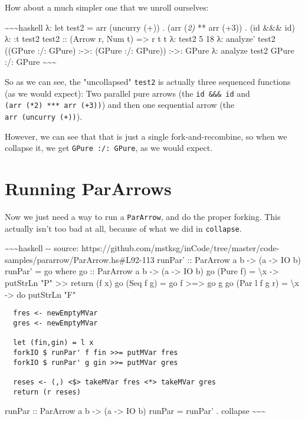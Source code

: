 \documentclass[]{article}
\begin{document}
How about a much simpler one that we unroll ourselves:

\textasciitilde{}\textasciitilde{}\textasciitilde{}haskell λ: let test2 = arr
(uncurry (+)) \textbar{} . (arr (\emph{2) }** arr (+3)) \textbar{} . (id \&\&\&
id) λ: :t test2 test2 :: (Arrow r, Num t) =\textgreater{} r t t λ: test2 5 18 λ:
analyze' test2 ((GPure :/: GPure) :-\textgreater{}: (GPure :/: GPure))
:-\textgreater{}: GPure λ: analyze test2 GPure :/: GPure
\textasciitilde{}\textasciitilde{}\textasciitilde{}

So as we can see, the "uncollapsed" \texttt{test2} is actually three sequenced
functions (as we would expect): Two parallel pure arrows (the
\texttt{id\ \&\&\&\ id} and \texttt{(arr\ (*2)\ ***\ arr\ (+3))}) and then one
sequential arrow (the \texttt{arr\ (uncurry\ (+))}).

However, we can see that that is just a single fork-and-recombine, so when we
collapse it, we get \texttt{GPure\ :/:\ GPure}, as we would expect.

\section{Running ParArrows}

Now we just need a way to run a \texttt{ParArrow}, and do the proper forking.
This actually isn't too bad at all, because of what we did in \texttt{collapse}.

\textasciitilde{}\textasciitilde{}\textasciitilde{}haskell -\/- source:
https://github.com/mstksg/inCode/tree/master/code-samples/pararrow/ParArrow.hs\#L92-113
runPar' :: ParArrow a b -\textgreater{} (a -\textgreater{} IO b) runPar' = go
where go :: ParArrow a b -\textgreater{} (a -\textgreater{} IO b) go (Pure f) =
\textbackslash{}x -\textgreater{} putStrLn "P" \textgreater{}\textgreater{}
return (f x) go (Seq f g) = go f \textgreater{}=\textgreater{} go g go (Par l f
g r) = \textbackslash{}x -\textgreater{} do putStrLn "F"

\begin{verbatim}
  fres <- newEmptyMVar
  gres <- newEmptyMVar

  let (fin,gin) = l x
  forkIO $ runPar' f fin >>= putMVar fres
  forkIO $ runPar' g gin >>= putMVar gres

  reses <- (,) <$> takeMVar fres <*> takeMVar gres
  return (r reses)
\end{verbatim}

runPar :: ParArrow a b -\textgreater{} (a -\textgreater{} IO b) runPar = runPar'
. collapse \textasciitilde{}\textasciitilde{}\textasciitilde{}
\end{document}
